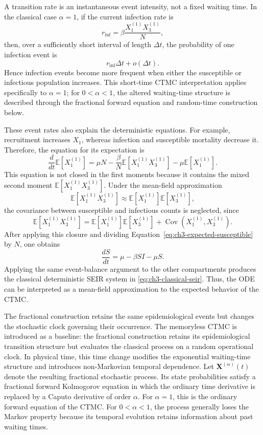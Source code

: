 \documentclass[00-main.tex]{subfiles}
\begin{document}
A transition rate is an instantaneous event intensity, not a fixed waiting time.
In the classical case $\alpha=1$, if the current infection rate is
\[
r_{\mathrm{inf}}=\beta\frac{X_1^{(1)}X_3^{(1)}}{N},
\]
then, over a sufficiently short interval of length $\Delta t$, the probability of one infection event is
\[
r_{\mathrm{inf}}\Delta t+o(\Delta t).
\]
Hence infection events become more frequent when either the susceptible or infectious population increases.
This short-time CTMC interpretation applies specifically to $\alpha=1$; for $0<\alpha<1$, the altered waiting-time structure is described through the fractional forward equation and random-time construction below.

These event rates also explain the deterministic equations.
For example, recruitment increases $X_1$, whereas infection and susceptible mortality decrease it.
Therefore, the equation for its expectation is
\begin{equation}
\label{eq:ch3-expected-susceptible}
\frac{d}{dt}\mathbb{E}[X_1^{(1)}]
=\mu N-\frac{\beta}{N}\mathbb{E}[X_1^{(1)}X_3^{(1)}]
-\mu\mathbb{E}[X_1^{(1)}].
\end{equation}
This equation is not closed in the first moments because it contains the mixed second moment $\mathbb{E}[X_1^{(1)}X_3^{(1)}]$.
Under the mean-field approximation
\[
\mathbb{E}[X_1^{(1)}X_3^{(1)}]
\approx
\mathbb{E}[X_1^{(1)}]\mathbb{E}[X_3^{(1)}],
\]
the covariance between susceptible and infectious counts is neglected, since
\[
\mathbb{E}[X_1^{(1)}X_3^{(1)}]
=\mathbb{E}[X_1^{(1)}]\mathbb{E}[X_3^{(1)}]
+\operatorname{Cov}(X_1^{(1)},X_3^{(1)}).
\]
After applying this closure and dividing Equation~\eqref{eq:ch3-expected-susceptible} by $N$, one obtains
\[
\frac{dS}{dt}=\mu-\beta SI-\mu S.
\]
Applying the same event-balance argument to the other compartments produces the classical deterministic SEIR system in \eqref{eq:ch3-classical-seir}.
Thus, the ODE can be interpreted as a mean-field approximation to the expected behavior of the CTMC.

The fractional construction retains the same epidemiological events but changes the stochastic clock governing their occurrence.
The memoryless CTMC is introduced as a baseline: the fractional construction retains its epidemiological transition structure but evaluates the classical process on a random operational clock.
In physical time, this time change modifies the exponential waiting-time structure and introduces non-Markovian temporal dependence.
Let $\boldsymbol{X}^{(\alpha)}(t)$ denote the resulting fractional stochastic process.
Its state probabilities satisfy a fractional forward Kolmogorov equation in which the ordinary time derivative is replaced by a Caputo derivative of order $\alpha$.
For $\alpha=1$, this is the ordinary forward equation of the CTMC.
For $0<\alpha<1$, the process generally loses the Markov property because its temporal evolution retains information about past waiting times.
\end{document}
